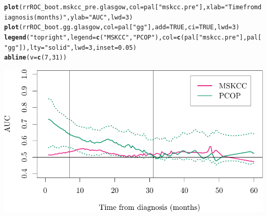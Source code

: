 \documentclass{article}\usepackage[]{graphicx}\usepackage[]{color}
\makeatletter
\def\maxwidth{ %
  \ifdim\Gin@nat@width>\linewidth
    \linewidth
  \else
    \Gin@nat@width
  \fi
}
\newcommand{\hlnum}[1]{\textcolor[rgb]{0.686,0.059,0.569}{#1}}%
\newcommand{\hlstr}[1]{\textcolor[rgb]{0.192,0.494,0.8}{#1}}%
\newcommand{\hlstd}[1]{\textcolor[rgb]{0.345,0.345,0.345}{#1}}%
\newcommand{\hlkwc}[1]{\textcolor[rgb]{0.333,0.667,0.333}{#1}}%
\newcommand{\hlkwd}[1]{\textcolor[rgb]{0.737,0.353,0.396}{\textbf{#1}}}%
\newenvironment{kframe}{%
 \def\at@end@of@kframe{}%
 \ifinner\ifhmode%
  \def\at@end@of@kframe{\end{minipage}}%
  \begin{minipage}{\columnwidth}%
 \fi\fi%
 \def\FrameCommand##1{\hskip\@totalleftmargin \hskip-\fboxsep
 \colorbox{shadecolor}{##1}\hskip-\fboxsep
     \hskip-\linewidth \hskip-\@totalleftmargin \hskip\columnwidth}%
 \MakeFramed {\advance\hsize-\width
   \@totalleftmargin\z@ \linewidth\hsize
   \@setminipage}}%
 {\par\unskip\endMakeFramed%
 \at@end@of@kframe}
\newenvironment{knitrout}{}{} %
\makeatother
\begin{document}
\begin{knitrout}
\color{fgcolor}\begin{kframe}
\begin{alltt}
\hlkwd{plot}\hlstd{(rrROC_boot.mskcc_pre.glasgow,} \hlkwc{col} \hlstd{= pal[}\hlstr{"mskcc.pre"}\hlstd{],} \hlkwc{xlab} \hlstd{=} \hlstr{"Time from diagnosis (months)"}\hlstd{,} \hlkwc{ylab} \hlstd{=} \hlstr{"AUC"}\hlstd{,} \hlkwc{lwd} \hlstd{=} \hlnum{3}\hlstd{)}
\hlkwd{plot}\hlstd{(rrROC_boot.gg.glasgow,} \hlkwc{col} \hlstd{= pal[}\hlstr{"gg"}\hlstd{],} \hlkwc{add} \hlstd{=} \hlnum{TRUE}\hlstd{,} \hlkwc{ci} \hlstd{=} \hlnum{TRUE}\hlstd{,} \hlkwc{lwd} \hlstd{=} \hlnum{3}\hlstd{)}
\hlkwd{legend}\hlstd{(}\hlstr{"topright"}\hlstd{,} \hlkwc{legend} \hlstd{=} \hlkwd{c}\hlstd{(}\hlstr{"MSKCC"}\hlstd{,} \hlstr{"PCOP"}\hlstd{),} \hlkwc{col} \hlstd{=} \hlkwd{c}\hlstd{(pal[}\hlstr{"mskcc.pre"}\hlstd{], pal[}\hlstr{"gg"}\hlstd{]),} \hlkwc{lty} \hlstd{=} \hlstr{"solid"}\hlstd{,} \hlkwc{lwd} \hlstd{=} \hlnum{3}\hlstd{,} \hlkwc{inset} \hlstd{=} \hlnum{0.05}\hlstd{)}
\hlkwd{abline}\hlstd{(}\hlkwc{v} \hlstd{=} \hlkwd{c}\hlstd{(}\hlnum{7}\hlstd{,} \hlnum{31}\hlstd{))}
\end{alltt}
\end{kframe}

{\centering \includegraphics[width=\maxwidth]{figure/07-risksetROC-plot-glasgow-1} 

}



\end{knitrout}
\end{document}

